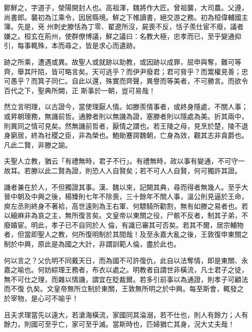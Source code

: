 
\begin{pinyinscope}

 鄭鮮之，字道子，滎陽開封人也。高祖渾，魏將作大匠。曾祖襲，大司農。父遵，尚書郎。襲初為江乘令，因居縣境。鮮之下帷讀書，絕交游之務。初為桓偉輔國主簿。先是，兗
 州刺史滕恬為丁零、翟遼所沒，屍喪不反，恬子羨仕宦不廢，議者嫌之。桓玄在荊州，使群僚博議，鮮之議曰：名教大極，忠孝而已，至乎變通抑引，每事輒殊，本而尋之，皆是求心而遺跡。



 跡之所乘，遭遇或異。故聖人或就跡以助教，或因跡以成罪，屈申與奪，難可等齊，舉其阡陌，皆可略言矣。天可逃乎？而伊尹廢君；君可脅乎？而鬻權見善；忠可愚乎？而箕子同仁。自此以還，殊實而齊聲，異譽而等美者，不可勝言。而欲令百代之下，聖典所闕，正
 斯事於一朝，豈可易哉！



 然立言明理，以古證今，當使理厭人情。如滕羨情事者，或終身隱處，不關人事；或昇朝理務，無譏前哲。通滕者則以無譏為證，塞滕者則以隱處為美。折其兩中，則異同之情可見矣。然無譏前哲者，厭情之謂也。若王陵之母，見烹於楚，陵不退身窮居，終為社稷之臣，非為榮也。鮑勛蹇諤魏朝，亡身為效，觀其志非貪爵也。凡此二賢，非滕之諭。



 夫聖人立教，猶云「有禮無時，君子不行」。有禮無時，政以事有變通，不可守一
 故耳。若滕以此二賢為證，則恐人人自賢矣；若不可人人自賢，何可獨許其證。



 譏者兼在於人，不但獨證其事。漢、魏以來，記闕其典，尋而得者無幾人。至乎大晉中朝及中興之後，楊臻則七年不除喪，三十餘年不關人事，溫公則見逼於王命，庾左丞則終身不著袷，高世遠則為王右軍、何驃騎所勸割，無有如滕之易者也。若以縗麻非為哀之主，無所復言矣。文皇帝以東關之役，尸骸不反者，制其子弟，不廢婚宦。明此，孝子已不自同於人
 倫，有識已審其可否矣。若其不爾，居宗輔物者，但當即聖人之教，何所復明制於其間哉！及至永嘉大亂之後，王敦復申東關之制於中興，原此是為國之大計，非謂訓範人倫，盡於此也。



 何以言之？父仇明不同戴天日，而為國不可許復仇，此自以法奪情，即是東關、永嘉之喻也。何妨綜理王務者，布衣以處之。明教者自謂世非橫流，凡士君子之徒，無不可仕之理，而雜以情譏，謂宜在貶裁爾。若多引前事以為通證，則孝子可顧法而不復
 仇矣。文皇帝無所立制於東關，王敦無所明之於中興。每至斯會，輒發之於宰物，是心可不喻乎！



 且夫求理當先以遠大，若滄海橫流，家國同其淪溺，若不仕也，則人有餘力；人有餘力，則國可至乎亡，家可至乎滅。當斯時也，匹婦猶亡其身，況大丈夫哉！




\end{pinyinscope}
